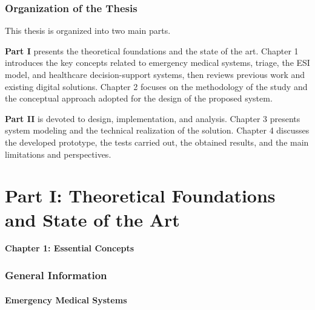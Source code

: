 \documentclass[a4paper,12pt,oneside]{report}
\begin{document}
\section*{Organization of the Thesis}

This thesis is organized into two main parts.

\textbf{Part I} presents the theoretical foundations and the state of the art. Chapter 1 introduces the key concepts related to emergency medical systems, triage, the ESI model, and healthcare decision-support systems, then reviews previous work and existing digital solutions. Chapter 2 focuses on the methodology of the study and the conceptual approach adopted for the design of the proposed system.

\textbf{Part II} is devoted to design, implementation, and analysis. Chapter 3 presents system modeling and the technical realization of the solution. Chapter 4 discusses the developed prototype, the tests carried out, the obtained results, and the main limitations and perspectives.

\clearpage

\part*{Part I: Theoretical Foundations and State of the Art}

\newpage
\thispagestyle{fancy}
{\LARGE \bfseries \noindent Chapter 1: Essential Concepts}
\vspace{2em}
\renewcommand{\thesection}{\Roman{section}}
\justifying

\section{General Information}

\subsection{Emergency Medical Systems}
\end{document}
